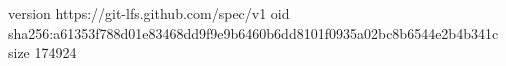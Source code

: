 version https://git-lfs.github.com/spec/v1
oid sha256:a61353f788d01e83468dd9f9e9b6460b6dd8101f0935a02bc8b6544e2b4b341c
size 174924
